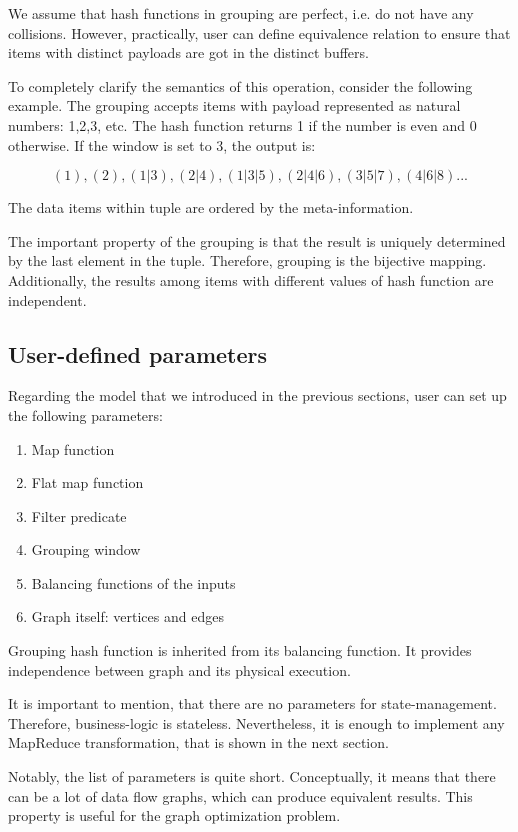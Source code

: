 We assume that hash functions in grouping are perfect, i.e. do not have any collisions. However, practically, user can define equivalence relation to ensure that items with distinct payloads are got in the distinct buffers.
	
To completely clarify the semantics of this operation, consider the following example. The grouping accepts items with payload represented as natural numbers: 1,2,3, etc. The hash function returns 1 if the number is even and 0 otherwise. If the window is set to 3, the output is:

\[(1), (2), (1|3), (2|4), (1|3|5), (2|4|6), (3|5|7), (4|6|8)...\]

The data items within tuple are ordered by the meta-information. 

The important property of the grouping is that the result is uniquely determined by the last element in the tuple. Therefore, grouping is the bijective mapping. Additionally, the results among items with different values of hash function are independent.

\subsection{User-defined parameters}

Regarding the model that we introduced in the previous sections, user can set up the following parameters:

\begin{enumerate}
  \item{Map function}
  \item{Flat map function}
  \item{Filter predicate}
  \item{Grouping window}
  \item{Balancing functions of the inputs}
  \item{Graph itself: vertices and edges}
\end{enumerate}

Grouping hash function is inherited from its balancing function. It provides independence between graph and its physical execution. 

It is important to mention, that there are no parameters for state-management. Therefore, business-logic is stateless. Nevertheless, it is enough to implement any MapReduce transformation, that is shown in the next section.

Notably, the list of parameters is quite short. Conceptually, it means that there can be a lot of data flow graphs, which can produce equivalent results. This property is useful for the graph optimization problem.    


